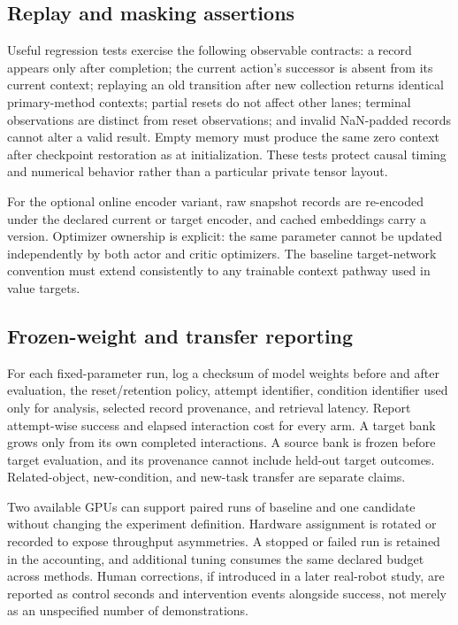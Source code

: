 \documentclass[10pt,letterpaper]{article}
\begin{document}
\subsection{Replay and masking assertions}
Useful regression tests exercise the following observable contracts: a record appears only after completion; the current action's successor is absent from its current context; replaying an old transition after new collection returns identical primary-method contexts; partial resets do not affect other lanes; terminal observations are distinct from reset observations; and invalid NaN-padded records cannot alter a valid result. Empty memory must produce the same zero context after checkpoint restoration as at initialization. These tests protect causal timing and numerical behavior rather than a particular private tensor layout.

For the optional online encoder variant, raw snapshot records are re-encoded under the declared current or target encoder, and cached embeddings carry a version. Optimizer ownership is explicit: the same parameter cannot be updated independently by both actor and critic optimizers. The baseline target-network convention must extend consistently to any trainable context pathway used in value targets.

\subsection{Frozen-weight and transfer reporting}
For each fixed-parameter run, log a checksum of model weights before and after evaluation, the reset/retention policy, attempt identifier, condition identifier used only for analysis, selected record provenance, and retrieval latency. Report attempt-wise success and elapsed interaction cost for every arm. A target bank grows only from its own completed interactions. A source bank is frozen before target evaluation, and its provenance cannot include held-out target outcomes. Related-object, new-condition, and new-task transfer are separate claims.

Two available GPUs can support paired runs of baseline and one candidate without changing the experiment definition. Hardware assignment is rotated or recorded to expose throughput asymmetries. A stopped or failed run is retained in the accounting, and additional tuning consumes the same declared budget across methods. Human corrections, if introduced in a later real-robot study, are reported as control seconds and intervention events alongside success, not merely as an unspecified number of demonstrations.
\end{document}
